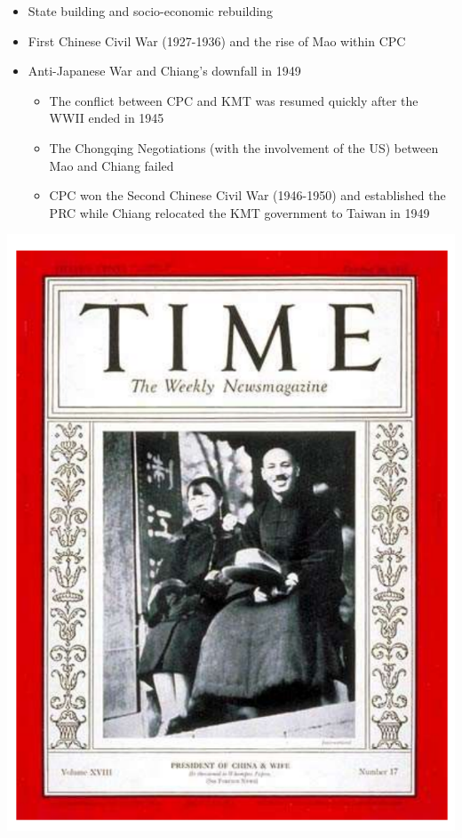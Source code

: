 \documentclass[
  10pt,
  ignorenonframetext,
]{beamer}
\begin{document}
\begin{frame}
\begin{itemize}
  \item State building and socio-economic rebuilding
  \vspace{0.6cm}
  \item First Chinese Civil War (1927-1936) and the rise of Mao within CPC
  \vspace{0.6cm}
  \item Anti-Japanese War and Chiang's downfall in 1949
  \vspace{0.1cm}
  \begin{itemize}
    \item The conflict between CPC and KMT was resumed quickly after the WWII ended in 1945
    \item The Chongqing Negotiations (with the involvement of the US) between Mao and Chiang failed 
    \item CPC won the Second Chinese Civil War (1946-1950) and established the PRC while Chiang relocated the KMT government to Taiwan in 1949
  \end{itemize}
\end{itemize}
\end{frame}

\begin{frame}
\vspace{0.3cm}

\begin{center}\includegraphics[width=0.5\linewidth]{Figs/chiang_new} \end{center}
\end{frame}
\end{document}
